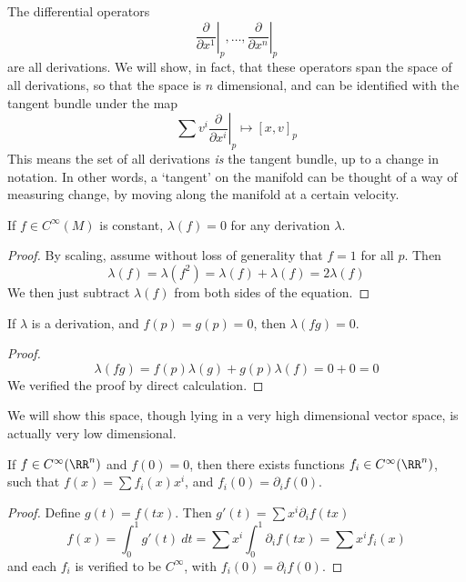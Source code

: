 The differential operators
%
\[ \left. \frac{\partial}{\partial x^1} \right|_p, \dots, \left. \frac{\partial}{\partial x^n}\right|_p \]
%
are all derivations. We will show, in fact, that these operators span the space of all derivations, so that the space is $n$ dimensional, and can be identified with the tangent bundle under the map
%
\[ \left. \sum v^i \frac{\partial}{\partial x^i} \right|_p \mapsto [x,v]_p \]
%
This means the set of all derivations {\it is} the tangent bundle, up to a change in notation. In other words, a `tangent' on the manifold can be thought of a way of measuring change, by moving along the manifold at a certain velocity.

\begin{lemma}
    If $f \in C^\infty(M)$ is constant, $\lambda(f) = 0$ for any derivation $\lambda$.
\end{lemma}
\begin{proof}
    By scaling, assume without loss of generality that $f = 1$ for all $p$. Then
    \[ \lambda(f) = \lambda(f^2) = \lambda(f) + \lambda(f) = 2 \lambda(f) \]
    We then just subtract $\lambda(f)$ from both sides of the equation.
\end{proof}

\begin{lemma}
    If $\lambda$ is a derivation, and $f(p) = g(p) = 0$, then $\lambda(fg) = 0$.
\end{lemma}
\begin{proof}
    \[ \lambda(fg) = f(p) \lambda(g) + g(p) \lambda(f) = 0 + 0 = 0 \]
    We verified the proof by direct calculation.
\end{proof}

We will show this space, though lying in a very high dimensional vector space, is actually very low dimensional.

\begin{lemma}
    If $f \in C^\infty(\RR^n)$ and $f(0) = 0$, then there exists functions $f_i \in C^\infty(\RR^n)$, such that $f(x) = \sum f_i(x) x^i$, and $f_i(0) = \partial_i f(0)$.
\end{lemma}
\begin{proof}
    Define $g(t) = f(tx)$. Then $g'(t) = \sum x^i \partial_i f(tx)$
    \[ f(x) = \int_0^1 g'(t)\ dt = \sum x^i \int_0^1 \partial_i f(tx) = \sum x^i f_i(x) \]
    and each $f_i$ is verified to be $C^\infty$, with $f_i(0) = \partial_i f(0)$.
\end{proof}

